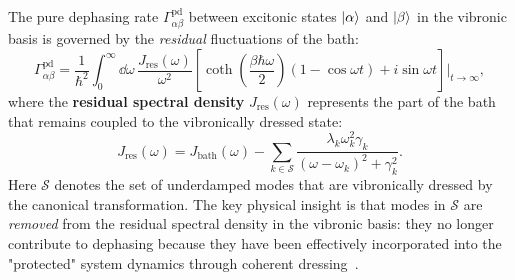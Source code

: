 \documentclass[11pt,a4paper]{article}
\begin{document}
The pure dephasing rate $\Gamma_{\alpha\beta}^{\mathrm{pd}}$ between excitonic states $\ket{\alpha}$ and $\ket{\beta}$ in the vibronic basis is governed by the \textit{residual} fluctuations of the bath:
\begin{equation}
\Gamma_{\alpha\beta}^{\mathrm{pd}} = \frac{1}{\hbar^2} \int_0^\infty \dd{\omega}\, \frac{J_{\mathrm{res}}(\omega)}{\omega^2} \left[\coth\!\left(\frac{\beta\hbar\omega}{2}\right)(1 - \cos\omega t) + i\sin\omega t\right]\bigg|_{t\to\infty},
\label{eq:SI_dephasing_rate}
\end{equation}
where the \textbf{residual spectral density} $J_{\mathrm{res}}(\omega)$ represents the part of the bath that remains coupled to the vibronically dressed state:
\begin{equation}
J_{\mathrm{res}}(\omega) = J_{\mathrm{bath}}(\omega) - \sum_{k \in \mathcal{S}} \frac{\lambda_k \omega_k^2 \gamma_k}{(\omega - \omega_k)^2 + \gamma_k^2}.
\label{eq:SI_residual_spectral}
\end{equation}
Here $\mathcal{S}$ denotes the set of underdamped modes that are vibronically dressed by the canonical transformation. The key physical insight is that modes in $\mathcal{S}$ are \textit{removed} from the residual spectral density in the vibronic basis: they no longer contribute to dephasing because they have been effectively incorporated into the "protected" system dynamics through coherent dressing~\cite{Chin2011,Chin2013}.
\end{document}
